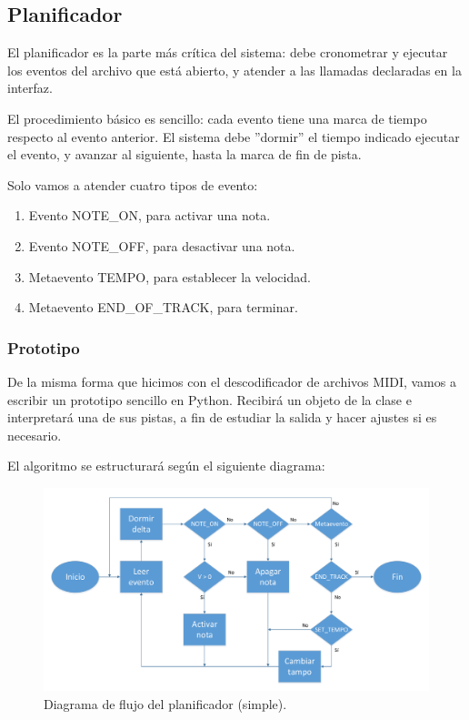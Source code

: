 \subsection{Planificador}
\label{subsec:impl_planificador}

El planificador es la parte más crítica del sistema: debe cronometrar y ejecutar los eventos del archivo que está abierto, y atender a las llamadas declaradas en la interfaz.

El procedimiento básico es sencillo: cada evento tiene una marca de tiempo respecto al evento anterior. El sistema debe ''dormir'' el tiempo indicado ejecutar el evento, y avanzar al siguiente, hasta la marca de fin de pista.

Solo vamos a atender cuatro tipos de evento:

\begin{enumerate}
	\item Evento NOTE\_ON, para activar una nota.
	\item Evento NOTE\_OFF, para desactivar una nota.
	\item Metaevento TEMPO, para establecer la velocidad.
	\item Metaevento END\_OF\_TRACK, para terminar.
\end{enumerate}

\subsubsection{Prototipo}

De la misma forma que hicimos con el descodificador de archivos \acrshort{MIDI}, vamos a escribir un prototipo sencillo en Python. Recibirá un objeto de la clase  e interpretará una de sus pistas, a fin de estudiar la salida y hacer ajustes si es necesario.

El algoritmo se estructurará según el siguiente diagrama:

\smallskip

\begin{figure}[H]
	\noindent \begin{centering}
		\includegraphics[width=\linewidth]{capitulo5/flujo_planificacion}
		\par\end{centering}
	\smallskip
	\caption{\label{fig:flujo_planificacion} Diagrama de flujo del planificador (simple).}
\end{figure}

